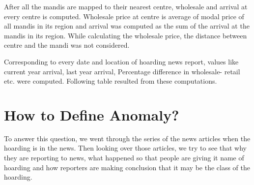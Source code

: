 After all the mandis are mapped to their nearest centre, wholesale and arrival at every centre is computed. Wholesale price at centre is average of modal price of all mandis in its region and arrival was computed as the sum of the arrival at the mandis in its region. While calculating the wholesale price, the distance between centre and the mandi was not considered.

Corresponding to every date and location of hoarding news report, values like current year arrival, last year arrival, Percentage difference in wholesale- retail etc. were computed. Following table resulted from these computations.


\section{How to Define Anomaly?}

To answer this question, we went through the series of the news articles when the hoarding is in the news. Then looking over those articles, we try to see that why they are reporting to news, what happened so that people are giving it name of hoarding and how reporters are making conclusion that it may be the class of the hoarding.

